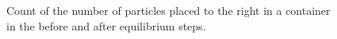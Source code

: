 \documentclass{article}
\begin{document}
\begin{figure}[htb]
  \label{fig:partdist}
  \caption{
     Count of the number of particles placed to the right in a container in the
     before and after equilibrium steps.
  }
\end{figure}



\end{document}
